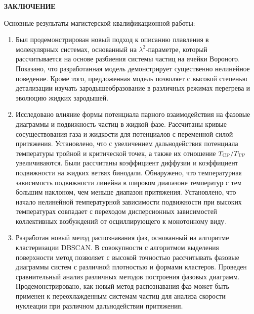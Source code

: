 \newpage
\begin{center}
  \textbf{\large ЗАКЛЮЧЕНИЕ}
\end{center}


Основные результаты магистерской квалификационной работы:
\begin{enumerate}

  \item Был продемонстрирован новый подход к описанию плавления в молекулярных системах, основанный на $\lambda^2$-параметре, который рассчитывается на основе разбиения системы частиц на ячейки Вороного.
        Показано, что разработанная модель демонстрирует существенно нелинейное поведение.
        Кроме того, предложенная модель позволяет с высокой степенью детализации изучать зародышеобразование в различных режимах перегрева и эволюцию жидких зародышей.

  \item Исследовано влияние формы потенциала парного взаимодействия на фазовые диаграммы и подвижность частиц в жидкой фазе.
        Рассчитаны кривые сосуществования газа и жидкости для потенциалов с переменной силой притяжения.
        Установлено, что с увеличением дальнодействия потенциала температуры тройной и критической точек, а также их отношение $T_{\rm CP}/T_{\rm TP}$ увеличиваются.
        Были рассчитаны коэффициент диффузии и коэффициент подвижности на жидких ветвях бинодали.
        Обнаружено, что температурная зависимость подвижности линейна в широком диапазоне температур с тем большим наклоном, чем меньше диапазон притяжения.
        Установлено, что начало нелинейной температурной зависимости подвижности при высоких температурах совпадает с переходом дисперсионных зависимостей коллективных возбуждений от осциллирующего к монотонному виду.

  \item Разработан новый метод распознавания фаз, основанный на алгоритме кластеризации DBSCAN.
        В совокупности с алгоритмом выделения поверхности метод позволяет с высокой точностью рассчитывать фазовые диаграммы систем с различной плотностью и формами кластеров.
        Проведен сравнительный анализ различных методов построения фазовых диаграмм.
        Продемонстрировано, как новый метод распознавания фаз может быть применен к переохлажденным системам частиц для анализа скорости нуклеации при различном дальнодействии притяжения.

\end{enumerate}
